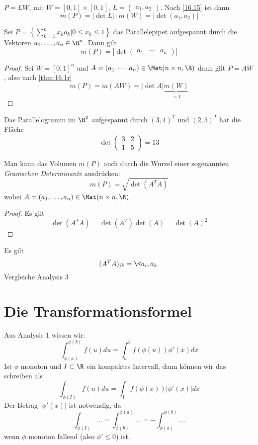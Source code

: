 \documentclass{mycourse}
\begin{document}
\begin{ex*}
	$P = LW$, mit $W = [0,1] \times [0,1]$, $L = \begin{pmatrix}a_1, a_2\end{pmatrix}$.
	Nach \ref{16.15} ist dann
	\[
		m(P) = |\det L|\cdot m(W) = |\det (a_1,a_2)|
	\]
\end{ex*}

\begin{kor}
	\label{16.16}
	Sei $P = \left\{\sum_{k=1}^n x_k a_k \big| 0\le x_k \le 1\right\}$ das Parallelepipet aufgespannt durch die Vektoren $a_1,\dotsc, a_n\in \R^n$.
	Dann gilt
	\[
		m(P) = \left|\det \begin{pmatrix}a_1 & \cdots & a_n\end{pmatrix}\right|
	\]
	\begin{proof}
		Sei $W = [0,1]^n$ und $A=(a_1 \;\cdots\; a_n) \in \Mat(n\times n,\R)$ dann gilt $P=AW$, also nach \ref{thm:16.1r}
		\[
			m(P) = m(AW) = |\det A| \underbrace{m(W)}_{=1}
		\]
	\end{proof}
\end{kor}

\begin{ex*}
	Das Parallelogramm im $\R^2$ aufgespannt durch $(3,1)^T$ und $(2,5)^T$ hat die Fläche
	\[
		\det \begin{pmatrix}3&2\\1&5\end{pmatrix} = 13
	\]
\end{ex*}

\begin{note}
	Man kann das Volumen $m(P)$ auch durch die Wurzel einer sogenannten \emph{Gramschen Determinante} ausdrücken:
	\[
		m(P) = \sqrt{\det(A^TA)}
	\]
	wobei $A= (a_1, \dotsc, a_n)\in \Mat(n\times n,\R)$.
	\begin{proof}
		Es gilt
		\[
			\det(A^TA) = \det(A^T)\det(A) = \det(A)^2
		\]
	\end{proof}
	Es gilt
	\[
		(A^TA)_{ik} = \<a_i,a_k\>
	\]
	Vergleiche Analysis 3
\end{note}


\section{Die Transformationsformel}


Aus Analysis 1 wissen wir:
\[
	\int_{\phi(a)}^{\phi(b)}f(u) du = \int_a^b f(\phi(u))\phi'(x)dx
\]
Ist $\phi$ monoton und $I\subset \R$ ein kompaktes Intervall, dann können wir das schreiben als
\[
	\int_{\phi(I)}f(u)du = \int_If(\phi(x))|\phi'(x)|dx
\]
Der Betrag $|\phi'(x)|$ ist notwendig, da
\[
	\int_{\phi(I)}\dotso =  \int_{\phi(b)}^{\phi(a)} \dotso = - \int_{\phi(a)}^{\phi(b)}\dotso
\]
wenn $\phi$ monoton fallend (also $\phi' \le 0$) ist.
\end{document}
